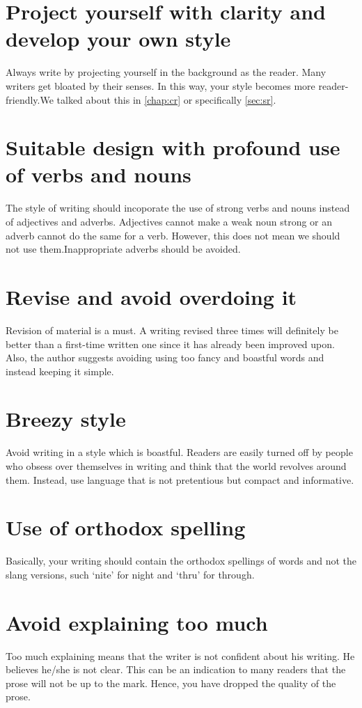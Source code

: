 \documentclass{report}
\begin{document}
\section{Project yourself with clarity and develop your own style}
Always write by projecting yourself in the background as the reader. Many writers get bloated by their senses. In this way, your style becomes more reader-friendly.We talked about this in \ref{chap:cr} or specifically \ref{sec:sr}.
\section{Suitable design with profound use of verbs and nouns}
The style of writing should incoporate the use of strong verbs and nouns instead of adjectives and adverbs. Adjectives cannot make a weak noun strong or an adverb cannot do the same for a verb. However, this does not mean we should not use them.Inappropriate adverbs should be avoided.
\section{Revise and avoid overdoing it}
Revision of material is a must. A writing revised three times will definitely be better than a first-time written one since it has already been improved upon. Also, the author suggests avoiding using too fancy and boastful words and instead keeping it simple.
\section{Breezy style}
Avoid writing in a style which is boastful. Readers are easily turned off by people who obsess over themselves in writing and think that the world revolves around them. Instead, use language that is not pretentious but compact and informative.
\section{Use of orthodox spelling}
Basically, your writing should contain the orthodox spellings of words and not the slang versions, such `nite' for night and `thru' for through.
\section{Avoid explaining too much}
Too much explaining means that the writer is not confident about his writing. He believes he/she is not clear. This can be an indication to many readers that the prose will not be up to the mark. Hence, you have dropped the quality of the prose.
\end{document}
